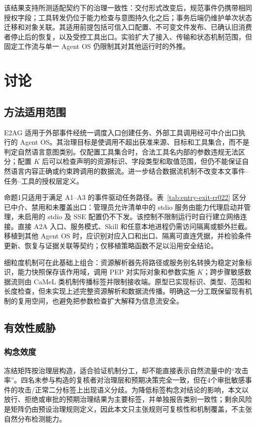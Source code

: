 该结果支持所测适配契约下的治理一致性：交付形式改变后，规范事件仍携带相同授权字段；工具转发仍位于能力检查与意图持久化之后；事务后端仍维护单次状态迁移和对象关联。其适用前提包括可信入口配置、不可变文件发布、已确认旧消费者停止后的恢复，以及受控工具出口。实验扩大了接入、传输和状态机制范围，但固定工作流与单一 Agent OS 仍限制其对其他运行时的外推。

\section{讨论}\label{sec:discussion-v11}

\subsection{方法适用范围}

E2AG 适用于外部事件经统一调度入口创建任务、外部工具调用经可中介出口执行的 Agent OS。其治理目标是使调用不超出获准来源、目标和工具集合，而不是判定自然语言意图类别。仅配置工具集合时，合法工具名内部的参数违规无法区分；配置 $K$ 后可以检查声明的资源标识、字段类型和取值范围，但仍不能保证自然语言内容正确或约束跨调用的数据流。进一步结合数据流机制不改变本文事件--任务--工具的授权层定义。

命题1只适用于满足 A1--A3 的事件驱动任务路径。表~\ref{tab:entry-exit-rr022} 区分已中介、禁用和未覆盖出口：管理员允许清单中的 stdio 服务由能力代理启动并管理，未启用的 stdio 及 SSE 配置仍不下发。该控制不限制运行时自行建立网络连接。直接 A2A 入口、服务模式、Skill 和任意本地进程仍需访问隔离或额外拦截。移植到其他 Agent OS 时，应识别对应入口和出口、隔离可直连凭据，并检验条件更新、恢复与证据关联等契约；仅移植策略函数不足以沿用安全结论。

细粒度机制可在此基础上组合：资源解析器先将路径或服务别名转换为稳定对象标识，能力快照保存该作用域，调用 PEP 对实际对象和参数实施 $K$；跨步骤敏感数据流则由 CaMeL 类机制传播标签并限制接收端。原型已实现标识、类型、范围和长度检查，但未实现上述完整资源解析和数据流传播。明确这一分工既保留现有机制的复用空间，也避免把参数检查扩大解释为信息流安全。

\subsection{有效性威胁}

\subsubsection{构念效度}

冻结矩阵按治理层构造，适合验证机制分工，却不能直接表示自然流量中的“攻击率”。四名未参与构造的复核者对治理层和预期决策完全一致，但在4个审批敏感事件的攻击/正常二分标签上出现语义分歧。为降低标签构念对结论的影响，本文以放行、拒绝或审批的预期治理结果为主要标签，并单独报告类别一致性；剩余风险是矩阵仍由预设治理规则定义，因此本文只主张规则可复核性和机制覆盖，不主张自然分布检测能力。

